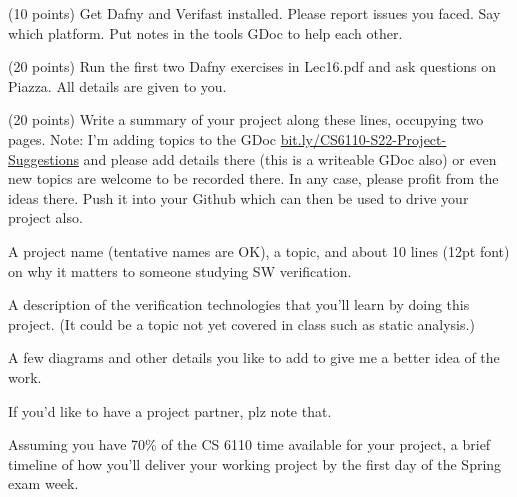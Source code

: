 \documentclass[11pt]{article}
\begin{document}
\begin{compactenum}
\begin{compactenum}
\begin{compactenum}
    \item (10 points)
      Get Dafny and Verifast installed. Please report issues you faced.
      Say which platform. Put notes in the tools GDoc to help each other.
    \end{compactenum}
    
  \item (20 points)
    Run the first two Dafny exercises in Lec16.pdf and ask questions
    on Piazza. All details are given to you.
  \end{compactenum}


  
\begin{minipage}{\minpagw}
\end{minipage}

\item (20 points)
  Write a summary of your project along these lines, occupying two pages.
  Note: I'm adding topics to the GDoc
  \url{bit.ly/CS6110-S22-Project-Suggestions}
  and please add details there (this is a writeable GDoc also) or even
  new topics are welcome to be recorded there. In any case, please
  profit from the ideas there.
  Push it into your Github which can then be used to drive your project also.
  \begin{compactitem}
  \item A project name (tentative names are OK), a topic,
    and about 10 lines (12pt font) on why it matters to
    someone studying SW verification.
    
  \item A description of the verification technologies that you'll learn
    by doing this project. (It could be a topic not yet covered in class
    such as static analysis.)

  \item A few diagrams and other details you like to add to give me a better
    idea of the work.

  \item If you'd like to have a project partner, plz note that.

  \item Assuming you have 70\% of the CS 6110 time available for your
    project, a brief timeline of how you'll deliver your working project
    by the first day of the Spring exam week.
  \end{compactitem}
  
\begin{minipage}{\minpagw}
\end{minipage}  
  


\end{compactenum}
\end{document}
